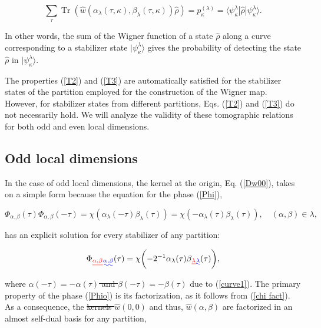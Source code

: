 \documentclass[quantumrep,article,submit,pdftex,moreauthors]{Definitions/mdpi}
\DeclareMathOperator{\Tr}{Tr}
\providecommand{\DIFadd}[1]{{\protect\color{blue}\uwave{#1}}} %
\providecommand{\DIFdel}[1]{{\protect\color{red}\sout{#1}}}                      %
\providecommand{\DIFaddbegin}{} %
\providecommand{\DIFaddend}{} %
\providecommand{\DIFdelbegin}{} %
\providecommand{\DIFdelend}{} %
\begin{document}
\begin{equation}
  \sum_{\tau } \Tr\left(
    \hat{w}\left(
      \alpha_{\lambda}(\tau,\kappa),\beta_{\lambda}(\tau,\kappa)
    \right) \hat{\rho}
  \right)
  = p_{\kappa}^{(\lambda)}
  = \langle \psi_{\kappa}^{\lambda} |\hat{\rho}|\psi_{\kappa}^{\lambda}\rangle.
  \label{T3}
\end{equation}

In other words, the sum of the Wigner function of a state $\hat{\rho}$ along a
curve corresponding to a stabilizer state $|\psi _{\kappa }^{\lambda }\rangle$
gives the probability of detecting the state $\hat{\rho}$ in $|\psi_{\kappa
}^{\lambda}\rangle$.

The properties (\ref{T2}) and (\ref{T3}) are automatically satisfied for the
stabilizer states of the partition employed for the construction of the Wigner
map. However, for stabilizer states from different partitions, Eqs. (\ref{T2})
and (\ref{T3}) do not necessarily hold. We will analyze the validity of these
tomographic relations for both odd and even local dimensions.

\subsection{Odd local dimensions}

In the case of odd local dimensions, the kernel at the origin, Eq. (\ref{Dw00}),
takes on a simple form because the equation for the phase (\ref{Phi}), 

\DIFaddbegin 

\DIFaddend \begin{equation*}
  \Phi_{\alpha,\beta} (\tau) \Phi_{\alpha,\beta}(-\tau)
  = \chi\left(\alpha_{\lambda}(-\tau)\beta_{\lambda}(\tau)\right)
  = \chi\left(-\alpha_{\lambda}(\tau)\beta_{\lambda}(\tau)\right),
  \quad (\alpha,\beta) \in \lambda,
\end{equation*}

has an explicit solution for every stabilizer of any partition:

\begin{equation}
  \Phi\DIFdelbegin \DIFdel{_{\alpha,\beta}}\DIFdelend \DIFaddbegin \DIFadd{_{\alpha ,\beta }}\DIFaddend (\tau)
  = \chi\left( -2^{-1}\alpha _{\lambda }(\tau)\beta\DIFdelbegin \DIFdel{_{\lambda }}\DIFdelend \DIFaddbegin \DIFadd{_{\lambda}}\DIFaddend (\tau)\right),
  \label{Phio}
\end{equation}

where \DIFdelbegin \DIFdel{$\alpha(-\tau) = -\alpha(\tau)$ and $\beta(-\tau) = -\beta(\tau)$
}\DIFdelend \DIFaddbegin \DIFadd{$\alpha (-\tau )=-\alpha (\tau )$ and $\beta (-\tau )=-\beta (\tau )$ }\DIFaddend due
to (\ref{curve1}). The primary property of the phase (\ref{Phio}) is its
factorization, as it follows from (\ref{chi fact}). As a consequence, the
\DIFdelbegin \DIFdel{kernels $\hat{w}\left(0,0\right)$ }\DIFdelend \DIFaddbegin \DIFadd{kernel $\hat{w}\left( 0,0\right)$ }\DIFaddend and thus, \DIFdelbegin \DIFdel{$\hat{w}\left(\alpha,\beta\right)$
}\DIFdelend \DIFaddbegin \DIFadd{$\hat{w}\left(\alpha ,\beta\right)$
}\DIFaddend are factorized in an almost self-dual basis for any partition,
\end{document}
